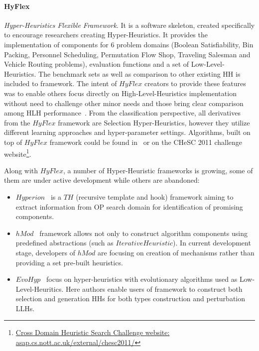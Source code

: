 \paragraph{HyFlex~\cite{ochoa2012hyflex}}\textit{Hyper-Heuristics Flexible Framework}. It is a software skeleton, created specifically to encourage researchers creating Hyper-Heuristics. It provides the implementation of components for 6 problem domains (Boolean Satisfiability, Bin Packing, Personnel Scheduling, Permutation Flow Shop, Traveling Salesman and Vehicle Routing problems), evaluation functions and a set of Low-Level-Heuristics. The benchmark sets as well as comparison to other existing HH is included to framework. The intent of $HyFlex$ creators to provide these features was to enable others focus directly on High-Level-Heuristics implementation without need to challenge other minor needs and those bring clear comparison among HLH performance~\cite{ochoa2012hyflex}. From the classification perspective, all derivatives from the $HyFlex$ framework are Selection Hyper-Heuristics, however they utilize different learning approaches and hyper-parameter settings. Algorithms, built on top of $HyFlex$ framework could be found in~\cite{misir2012intelligent,ryser2014review,drake2019recent} or on the CHeSC 2011 challenge website\footnote{\href{http://www.asap.cs.nott.ac.uk/external/chesc2011/}{Cross Domain Heuristic Search Challenge website: asap.cs.nott.ac.uk/external/chesc2011/}}.


Along with $HyFlex$, a number of Hyper-Heuristic frameworks is growing, some of them are under active development while others are abandoned:
\begin{itemize}
	\item $Hyperion$~\cite{swan2011hyperion} is a $TH$ (recursive template and hook) framework aiming to extract information from OP search domain for identification of promising components.
	
	\item $hMod$~\cite{urra2013hMod} framework allows not only to construct algorithm components using predefined abstractions (such as $IterativeHeuristic$). In current development stage, developers of $hMod$ are focusing on creation of mechanisms rather than providing a set pre-built heuristics. 
	
	\item $EvoHyp$~\cite{pillay2017evohyp} focus on hyper-heuristics with evolutionary algorithms used as Low-Level-Heuritics. Here authors enable users of framework to construct both selection and generation HHs for both types construction and perturbation LLHs.
	
\end{itemize} 

